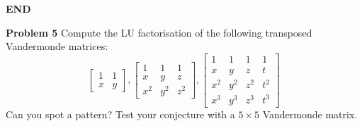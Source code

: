 \documentclass[12pt,a4paper]{article}
\begin{document}
\textbf{END}

\textbf{Problem 5} Compute the LU factorisation of the following transposed Vandermonde matrices:
\[
\begin{bmatrix}
1 & 1 \\
x & y
\end{bmatrix},
\begin{bmatrix}
1 & 1 & 1 \\
x & y & z \\
x^2 & y^2 & z^2
\end{bmatrix},
\begin{bmatrix}
1 & 1 & 1 & 1 \\
x & y & z & t \\
x^2 & y^2 & z^2 & t^2 \\
x^3 & y^3 & z^3 & t^3
\end{bmatrix}
\]
Can you spot a pattern? Test your conjecture with a $5 \ensuremath{\times} 5$ Vandermonde matrix.
\end{document}
